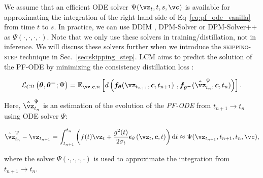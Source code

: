 \documentclass{article} %
\newcommand{\lsm}[1]{\textcolor{purple}{#1}}
\begin{document}
We assume that an efficient ODE solver $\Psi(\vz_{t},t, s, \vc)$ is available for approximating the integration
of the right-hand side of Eq~\eqref{eq:pf_ode_vanilla}
from time $t$ to $s$.
In practice, we can use DDIM \citep{song2020denoising}, DPM-Solver \citep{lu2022dpm} or DPM-Solver++ \citep{lu2022dpm++} as $\Psi(\cdot,\cdot,\cdot,\cdot)$.
Note that we only use these solvers in training/distillation, not in inference.
We will discuss these solvers further when we introduce the \textsc{skipping-step} technique in Sec.~\ref{sec:skipping_step}. LCM aims to predict the solution of the PF-ODE by minimizing the consistency distillation loss \citep{song2023consistency}: 
\begin{small}
\begin{equation}
\mathcal{L_{CD}}\left(\boldsymbol{\theta},\boldsymbol{\theta^-};\Psi\right) = \mathbb{E}_{\vz,\boldsymbol{c},n}\left[d\left(\boldsymbol{f_\theta}(\boldsymbol{\vz}_{t_{n+1}}, \boldsymbol{c}, t_{n+1})\ , \boldsymbol{f_{\theta^-}}(\boldsymbol{\hat{\vz}}^{\Psi}_{t_{n}},  \boldsymbol{c}, t_{n})\right)\right].
\label{eq:lcm_consistency_loss_vanilla}
\vspace{-0.05in}
\end{equation}
\end{small}
Here, $\boldsymbol{\hat{\vz}}^{\Psi}_{t_{n}}$ is an estimation of the evolution of the {\em{PF-ODE}} from $t_{n+1}\rightarrow t_{n}$ using ODE solver $\Psi$:
\begin{footnotesize}
\begin{equation}
\begin{aligned}
    \hat{\vz}^{\Psi}_{t_n} - \boldsymbol{\vz}_{t_{n+1}} =  \int_{t_{n+1}}^{t_n}\left(f(t) \boldsymbol{\vz}_t+\frac{g^2(t)}{2 \sigma_t} \boldsymbol{\epsilon}_{\theta}\left(\boldsymbol{\vz}_t, \boldsymbol{c},  t\right)\right) \mathrm{d}t 
    \approx  \Psi(\vz_{t_{n+1}},t_{n+1}, t_n, \vc),
    \label{eq:aug_pf_ode_estimate_vanilla}
\end{aligned}
\vspace{-0.03in}
\end{equation}
\end{footnotesize}
where the solver $\Psi(\cdot,\cdot,\cdot,\cdot)$ is used to approximate the integration from $t_{n+1}\rightarrow t_{n}$.
 
\end{document}
